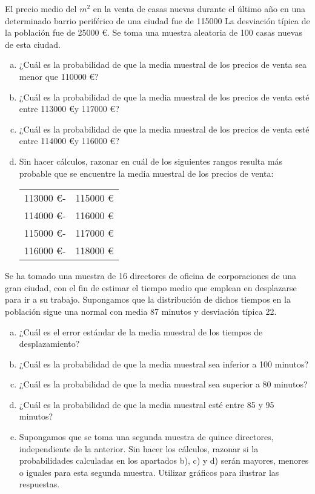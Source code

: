 \documentclass[12pt]{article}\usepackage[]{graphicx}\usepackage[]{color}
\begin{document}
\begin{prob}
El precio medio del $m^2$ en  la venta de casas nuevas durante el último año
en una determinado barrio periférico de una  ciudad  fue de 115000  La desviación
típica de la población fue de 25000 \euro. Se toma una muestra aleatoria de 100 casas nuevas de esta ciudad.
\begin{enumerate}[a)]
\item ¿Cuál es la probabilidad de que la media muestral de los precios de venta sea menor que 110000 \euro?
\item ¿Cuál es la probabilidad de que la media muestral de los precios de venta esté entre 113000 \euro y 117000 \euro?
\item ¿Cuál es la probabilidad de que la media muestral de los precios de venta esté entre 114000 \euro y 116000 \euro?
\item Sin hacer cálculos, razonar en cuál de los 
siguientes rangos resulta más probable que se encuentre la media muestral de los precios de venta:\break
\begin{center}
\begin{tabular}{ll}
113000 \euro-&115000 \euro\\
114000 \euro-&116000 \euro\\
115000 \euro-&117000 \euro\\
116000 \euro-&118000 \euro
\end{tabular}
\end{center}
\end{enumerate}
\end{prob}

\begin{prob}
Se ha tomado una muestra de 16 directores de oficina  de
corporaciones de una gran ciudad, con el fin de estimar el tiempo
medio que emplean en desplazarse para ir a su trabajo. Supongamos
que la distribución de dichos tiempos en la población sigue una
normal con media 87 minutos y desviación típica  22.
\begin{enumerate}[a)]
\item ¿Cuál es el error estándar de la media muestral de los
tiempos de desplazamiento?
\item ¿Cuál es la probabilidad de que la media muestral sea
inferior a 100 minutos?
\item ¿Cuál es la probabilidad de que la media muestral sea
superior  a 80 minutos?
\item ¿Cuál es la probabilidad de que la media muestral esté entre
85 y 95 minutos?
\item Supongamos que se toma una segunda muestra de quince directores,
independiente de la anterior. Sin hacer los cálculos, razonar si la probabilidades
calculadas en los apartados b), c) y d)  serán mayores, menores o iguales para esta segunda
muestra. Utilizar gráficos para ilustrar las respuestas.
\end{enumerate}
\end{prob}
\end{document}
